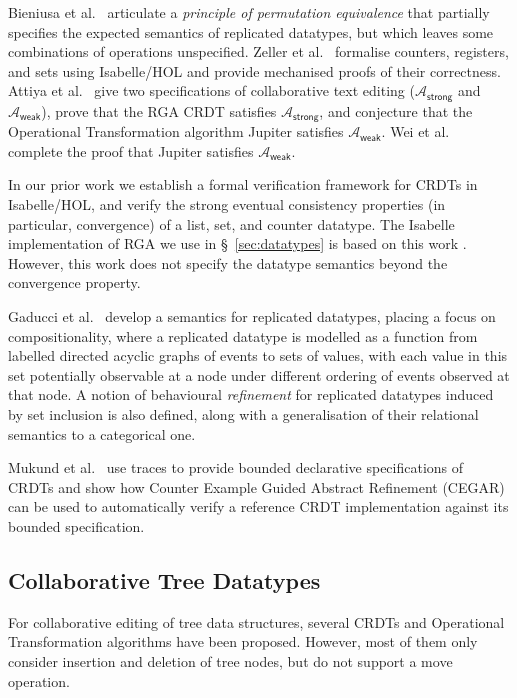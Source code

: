 Bieniusa et al.~\cite{Bieniusa:2012gt} articulate a \emph{principle of permutation equivalence} that partially specifies the expected semantics of replicated datatypes, but which leaves some combinations of operations unspecified.
Zeller et al.~\cite{Zeller:2014fl} formalise counters, registers, and sets using Isabelle/HOL and provide mechanised proofs of their correctness.
Attiya et al.~\cite{Attiya:2016kh} give two specifications of collaborative text editing ($\mathcal{A}_\textsf{strong}$ and $\mathcal{A}_\textsf{weak}$), prove that the RGA CRDT \cite{Roh:2011dw} satisfies $\mathcal{A}_\textsf{strong}$, and conjecture that the Operational Transformation algorithm Jupiter \cite{Nichols:1995fd} satisfies $\mathcal{A}_\textsf{weak}$.
Wei et al.~\cite{Wei:2017tg} complete the proof that Jupiter satisfies $\mathcal{A}_\textsf{weak}$.

In our prior work \cite{Gomes:2017gy} we establish a formal verification framework for CRDTs in Isabelle/HOL, and verify the strong eventual consistency properties (in particular, convergence) of a list, set, and counter datatype.
The Isabelle implementation of RGA we use in \S~\ref{sec:datatypes} is based on this work \cite{Gomes:2017vo}.
However, this work does not specify the datatype semantics beyond the convergence property.

Gaducci et al.~\cite{DBLP:conf/coordination/GadducciMR17} develop a semantics for replicated datatypes, placing a focus on compositionality, where a replicated datatype is modelled as a function from labelled directed acyclic graphs of events to sets of values, with each value in this set potentially observable at a node under different ordering of events observed at that node.
A notion of behavioural \emph{refinement} for replicated datatypes induced by set inclusion is also defined, along with a generalisation of their relational semantics to a categorical one.

Mukund et al.~\cite{DBLP:conf/atva/MukundRS15} use traces to provide bounded declarative specifications of CRDTs and show how Counter Example Guided Abstract Refinement (CEGAR) can be used to automatically verify a reference CRDT implementation against its bounded specification.

\subsection{Collaborative Tree Datatypes}

For collaborative editing of tree data structures, several CRDTs \cite{Martin:2010ih,Kleppmann:2016ve} and Operational Transformation algorithms \cite{Jungnickel:2016cb,Ignat:2003jy,Davis:2002iv} have been proposed.
However, most of them only consider insertion and deletion of tree nodes, but do not support a move operation.

